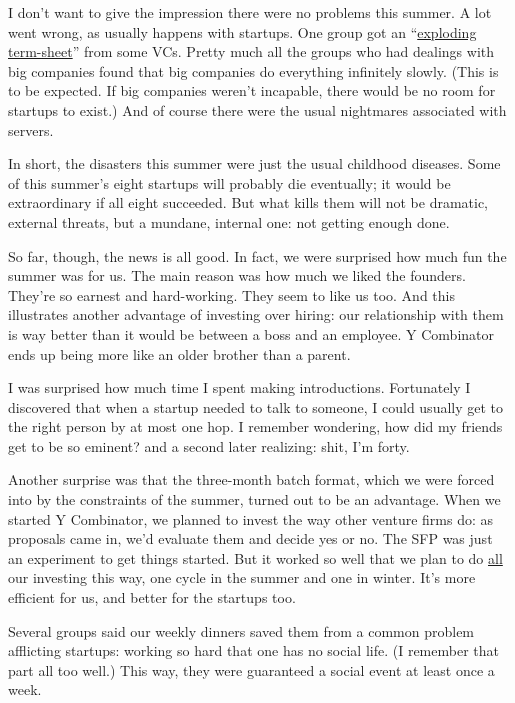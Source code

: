 I don't want to give the impression there were no problems this summer.
A lot went wrong, as usually happens with startups. One group got an
``\href{http://www.ventureblog.com/articles/indiv/2003/000024.html}{exploding
term-sheet}'' from some VCs. Pretty much all the groups who had dealings
with big companies found that big companies do everything infinitely
slowly. (This is to be expected. If big companies weren't incapable,
there would be no room for startups to exist.) And of course there were
the usual nightmares associated with servers.

In short, the disasters this summer were just the usual childhood
diseases. Some of this summer's eight startups will probably die
eventually; it would be extraordinary if all eight succeeded. But what
kills them will not be dramatic, external threats, but a mundane,
internal one: not getting enough done.

So far, though, the news is all good. In fact, we were surprised how
much fun the summer was for us. The main reason was how much we liked
the founders. They're so earnest and hard-working. They seem to like us
too. And this illustrates another advantage of investing over hiring:
our relationship with them is way better than it would be between a boss
and an employee. Y Combinator ends up being more like an older brother
than a parent.

I was surprised how much time I spent making introductions. Fortunately
I discovered that when a startup needed to talk to someone, I could
usually get to the right person by at most one hop. I remember
wondering, how did my friends get to be so eminent? and a second later
realizing: shit, I'm forty.

Another surprise was that the three-month batch format, which we were
forced into by the constraints of the summer, turned out to be an
advantage. When we started Y Combinator, we planned to invest the way
other venture firms do: as proposals came in, we'd evaluate them and
decide yes or no. The SFP was just an experiment to get things started.
But it worked so well that we plan to do
\href{http://ycombinator.com/funding.html}{all} our investing this way,
one cycle in the summer and one in winter. It's more efficient for us,
and better for the startups too.

Several groups said our weekly dinners saved them from a common problem
afflicting startups: working so hard that one has no social life. (I
remember that part all too well.) This way, they were guaranteed a
social event at least once a week.

